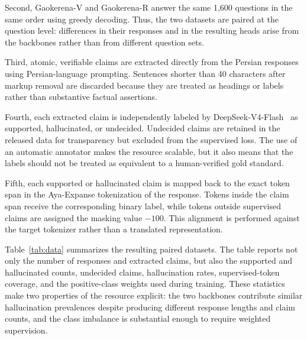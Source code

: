 \documentclass[conference]{IEEEtran}
\begin{document}
Second, Gaokerena-V and Gaokerena-R answer the same 1,600 questions in the same order using greedy decoding. Thus, the two datasets are paired at the question level: differences in their responses and in the resulting heads arise from the backbones rather than from different question sets.

Third, atomic, verifiable claims are extracted directly from the Persian responses using Persian-language prompting. Sentences shorter than 40 characters after markup removal are discarded because they are treated as headings or labels rather than substantive factual assertions.

Fourth, each extracted claim is independently labeled by DeepSeek-V4-Flash~\cite{b13} as supported, hallucinated, or undecided. Undecided claims are retained in the released data for transparency but excluded from the supervised loss. The use of an automatic annotator makes the resource scalable, but it also means that the labels should not be treated as equivalent to a human-verified gold standard.

Fifth, each supported or hallucinated claim is mapped back to the exact token span in the Aya-Expanse tokenization of the response. Tokens inside the claim span receive the corresponding binary label, while tokens outside supervised claims are assigned the masking value $-100$. This alignment is performed against the target tokenizer rather than a translated representation.

Table~\ref{tab:data} summarizes the resulting paired datasets. The table reports not only the number of responses and extracted claims, but also the supported and hallucinated counts, undecided claims, hallucination rates, supervised-token coverage, and the positive-class weights used during training. These statistics make two properties of the resource explicit: the two backbones contribute similar hallucination prevalences despite producing different response lengths and claim counts, and the class imbalance is substantial enough to require weighted supervision.
\end{document}
